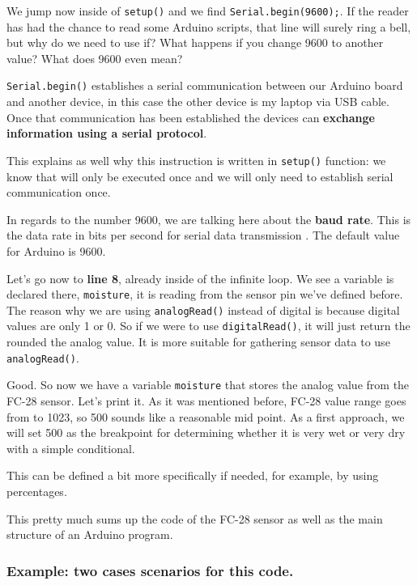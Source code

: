 We jump now inside of \verb|setup()| and we find \verb|Serial.begin(9600);|. If the reader has had the chance to read some Arduino scripts, that line will surely ring a bell, but why do we need to use if? What happens if you change 9600 to another value? What does 9600 even mean?

\verb|Serial.begin()| establishes a serial communication between our Arduino board and another device, in this case the other device is my laptop via USB cable. Once that communication has been established the devices can \textbf{exchange information using a serial protocol}.

This explains as well why this instruction is written in \verb|setup()| function: we know that will only be executed once and we will only need to establish serial communication once.

In regards to the number 9600, we are talking here about the \textbf{baud rate}. This is the data rate in bits per second for serial data transmission \cite{baud}. The default value for Arduino is 9600.

\vspace{5mm}
Let's go now to \textbf{line 8}, already inside of the infinite loop. We see a variable is declared there, \verb|moisture|, it is reading from the sensor pin we've defined before. The reason why we are using \verb|analogRead()| instead of digital is because digital values are only 1 or 0. So if we were to use \verb|digitalRead()|, it will just return the rounded the analog value. It is more suitable for gathering sensor data to use \verb|analogRead()|.

Good. So now we have a variable \verb|moisture| that stores the analog value from the FC-28 sensor. Let's print it. As it was mentioned before, FC-28 value range goes from  to 1023, so 500 sounds like a reasonable mid point. As a first approach, we will set 500 as the breakpoint for determining whether it is very wet or very dry with a simple conditional.

This can be defined a bit more specifically if needed, for example, by using percentages.

This pretty much sums up the code of the FC-28 sensor as well as the main structure of an Arduino program.

\vspace{7mm}
\subsubsection{Example: two cases scenarios for this code.}

